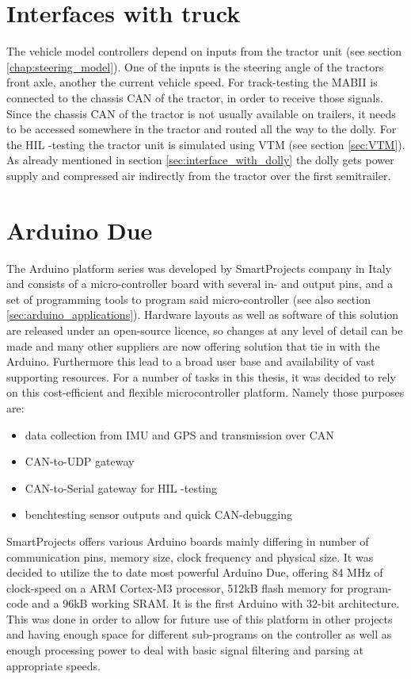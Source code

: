 \documentclass[ExampleMasters.tex]{subfiles}
\begin{document}
\section{Interfaces with truck}
\label{sec:interface_with_truck}
The vehicle model controllers depend on inputs from the tractor unit (see section \ref{chap:steering_model}). One of the inputs is the steering angle of the tractors front axle, another the current vehicle speed. For track-testing the \gls{MABII} is connected to the chassis \gls{CAN} of the tractor, in order to receive those signals. Since the chassis \gls{CAN} of the tractor is not usually available on trailers, it needs to be accessed somewhere in the tractor and routed all the way to the dolly.   
For the \gls{HIL} -testing the tractor unit is simulated using \gls{VTM}  (see section \ref{sec:VTM}). As already mentioned in section \ref{sec:interface_with_dolly} the dolly gets power supply and compressed air indirectly from the tractor over the first semitrailer.

\section{Arduino Due}
\label{sec:arduino}

The Arduino platform series was developed by  SmartProjects company in Italy and consists of a micro-controller board with several in- and output pins, and a set of programming tools to program said micro-controller (see also section \ref{sec:arduino_applications}). Hardware layouts as well as software of this solution are released under an open-source licence, so changes at any level of detail can be made and many other suppliers are now offering solution that tie in with the Arduino. Furthermore this lead to a broad user base and availability of vast supporting resources. For a number of tasks in this thesis, it was decided to rely on this cost-efficient and flexible microcontroller platform. Namely those purposes are:

\begin{itemize}	
	\item data collection from \gls{IMU} and \acrshort{GPS} and transmission over CAN
	\item CAN-to-UDP gateway
	\item CAN-to-Serial gateway for \gls{HIL} -testing
	\item benchtesting sensor outputs and quick CAN-debugging
\end{itemize}

SmartProjects offers various Arduino boards mainly differing in number of communication pins, memory size, clock frequency and physical size. It was decided to utilize the to date most powerful Arduino Due, offering 84 MHz of clock-speed on a ARM Cortex-M3 processor, 512kB flash memory for program-code and a 96kB working SRAM. It is the first Arduino with 32-bit architecture. This was done in order to allow for future use of this platform in other projects and having enough space for different sub-programs on the controller as well as enough processing power to deal with basic signal filtering and parsing at appropriate speeds. 
\end{document}
